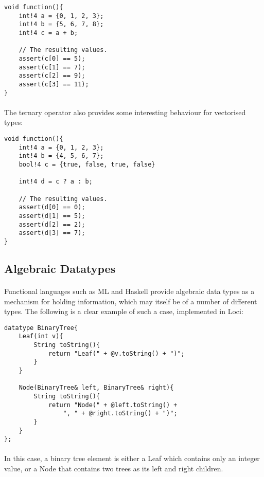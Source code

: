 \documentclass[12pt,twoside,notitlepage]{report}
\begin{document}
\begin{lstlisting}
void function(){
	int!4 a = {0, 1, 2, 3};
	int!4 b = {5, 6, 7, 8};
	int!4 c = a + b;
	
	// The resulting values.
	assert(c[0] == 5);
	assert(c[1] == 7);
	assert(c[2] == 9);
	assert(c[3] == 11);
}
\end{lstlisting}


\paragraph{}
The ternary operator also provides some interesting behaviour for vectorised types:


\begin{lstlisting}
void function(){
	int!4 a = {0, 1, 2, 3};
	int!4 b = {4, 5, 6, 7};
	bool!4 c = {true, false, true, false}
	
	int!4 d = c ? a : b;
	
	// The resulting values.
	assert(d[0] == 0);
	assert(d[1] == 5);
	assert(d[2] == 2);
	assert(d[3] == 7);
}
\end{lstlisting}

\clearpage

\subsection{Algebraic Datatypes}

\paragraph{}
Functional languages such as ML and Haskell provide algebraic data types as a mechanism for holding information, which may itself be of a number of different types. The following is a clear example of such a case, implemented in Loci:


\begin{lstlisting}
datatype BinaryTree{
	Leaf(int v){
		String toString(){
			return "Leaf(" + @v.toString() + ")";
		}
	}
	
	Node(BinaryTree& left, BinaryTree& right){
		String toString(){
			return "Node(" + @left.toString() +
				", " + @right.toString() + ")";
		}
	}
};
\end{lstlisting}


\paragraph{}
In this case, a binary tree element is either a Leaf which contains only an integer value, or a Node that contains two trees as its left and right children.
\end{document}
